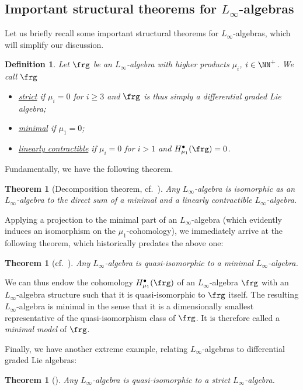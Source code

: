 \documentclass[reqno,a4paper,11pt]{article}
\newtheorem{definition}[thm]{Definition}
\newtheorem{theorem}[thm]{Theorem}
\begin{document}
\subsection{Important structural theorems for $L_\infty$-algebras}

Let us briefly recall some important structural theorems for $L_\infty$-algebras, which will simplify our discussion.
\begin{definition}
 Let $\frg$ be an $L_\infty$-algebra with higher products $\mu_i$, $i\in \NN^+$. We call $\frg$
 \begin{itemize}
  \setlength{\itemsep}{-1mm}
  \item[$\triangleright$] \uline{strict} if $\mu_i=0$ for $i\geq 3$ and $\frg$ is thus simply a differential graded Lie algebra;
  \item[$\triangleright$] \uline{minimal} if $\mu_1=0$;
  \item[$\triangleright$] \uline{linearly contractible} if $\mu_i=0$ for $i>1$ and $H^\bullet_{\mu_1}(\frg)=0$.
 \end{itemize}
\end{definition}
Fundamentally, we have the following theorem.
\begin{theorem}[Decomposition theorem, cf.~\cite{Kajiura:0306332}]
 Any $L_\infty$-algebra is isomorphic as an $L_\infty$-algebra to the direct sum of a minimal and a linearly contractible $L_\infty$-algebra.
\end{theorem}
Applying a projection to the minimal part of an $L_\infty$-algebra (which evidently induces an isomorphism on the $\mu_1$-cohomology), we immediately arrive at the following theorem, which historically predates the above one:
\begin{theorem}[cf.~\cite{kadeishvili1982algebraic,Kajiura:0306332}]
 Any $L_\infty$-algebra is quasi-isomorphic to a minimal $L_\infty$-algebra.
\end{theorem}
We can thus endow the cohomology $H^\bullet_{\mu_1}(\frg)$ of an $L_\infty$-algebra $\frg$ with an $L_\infty$-algebra structure such that it is quasi-isomorphic to $\frg$ itself. The resulting $L_\infty$-algebra is minimal in the sense that it is a dimensionally smallest representative of the quasi-isomorphism class of $\frg$. It is therefore called a {\em minimal model} of $\frg$.

Finally, we have another extreme example, relating $L_\infty$-algebras to differential graded Lie algebras:
\begin{theorem}[\cite{igor1995,Berger:0512576}]
 Any $L_\infty$-algebra is quasi-isomorphic to a strict $L_\infty$-algebra.
\end{theorem}
\end{document}
